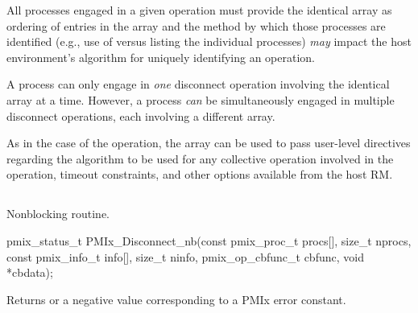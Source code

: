 \adviceuserstart
All processes engaged in a given  operation must provide the identical  array as ordering of entries in the array and the method by which those processes are identified (e.g., use of  versus listing the individual processes) \textit{may} impact the host environment's algorithm for uniquely identifying an operation.
\adviceuserend

A process can only engage in \emph{one} disconnect operation involving the identical  array at a time.
However, a process \emph{can} be simultaneously engaged in multiple disconnect operations, each involving a different  array.

As in the case of the  operation, the  array can be used to pass user-level directives regarding the algorithm to be used for any collective operation involved in the operation, timeout constraints, and other options available from the host \ac{RM}.


\subsection{}

\summary

Nonblocking  routine.

\format

\cspecificstart
\begin{codepar}
pmix_status_t
PMIx_Disconnect_nb(const pmix_proc_t procs[], size_t nprocs,
                   const pmix_info_t info[], size_t ninfo,
                   pmix_op_cbfunc_t cbfunc, void *cbdata);
\end{codepar}
\cspecificend

\begin{arglist}
\end{arglist}

Returns  or a negative value corresponding to a PMIx error constant.

